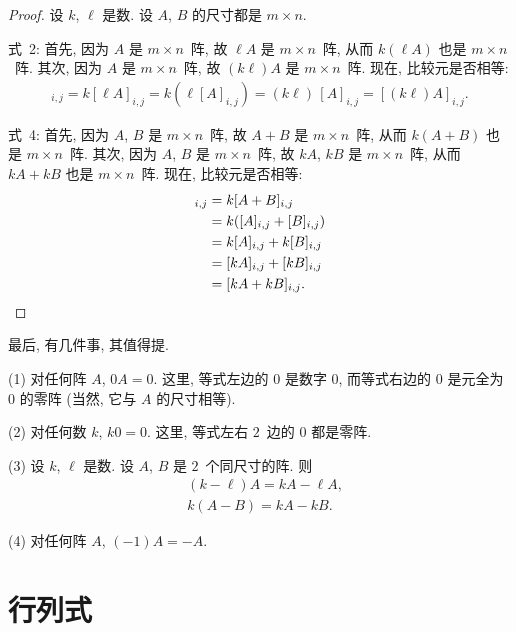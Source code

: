 \documentclass[../libro.tex]{subfiles}
\begin{document}
\begin{proof}
    设 \(k\), \(\ell\) 是数.
    设 \(A\), \(B\) 的尺寸都是 \(m \times n\).

    式~2:
    首先, 因为 \(A\) 是 \(m \times n\)~阵,
    故 \(\ell A\) 是 \(m \times n\)~阵,
    从而 \(k(\ell A)\) 也是 \(m \times n\)~阵.
    其次, 因为 \(A\) 是 \(m \times n\)~阵,
    故 \((k\ell) A\) 是 \(m \times n\)~阵.
    现在, 比较元是否相等:
    \begin{align*}
        [k(\ell A)]_{i,j}
        = k[\ell A]_{i,j}
        = k(\ell [A]_{i,j})
        = (k\ell)\, [A]_{i,j}
        = [(k\ell) A]_{i,j}.
    \end{align*}

    式~4:
    首先, 因为 \(A\), \(B\) 是 \(m \times n\)~阵,
    故 \(A + B\) 是 \(m \times n\)~阵,
    从而 \(k(A + B)\) 也是 \(m \times n\)~阵.
    其次, 因为 \(A\), \(B\) 是 \(m \times n\)~阵,
    故 \(kA\), \(kB\) 是 \(m \times n\)~阵,
    从而 \(kA + kB\) 也是 \(m \times n\)~阵.
    现在, 比较元是否相等:
    \begin{align*}
        [k(A + B)]_{i,j}
        = {} & k[A + B]_{i,j}           \\
        = {} & k([A]_{i,j} + [B]_{i,j}) \\
        = {} & k[A]_{i,j} + k[B]_{i,j}  \\
        = {} & [kA]_{i,j} + [kB]_{i,j}  \\
        = {} & [kA + kB]_{i,j}.
        \qedhere
    \end{align*}
\end{proof}

最后, 有几件事, 其值得提.

(1)
对任何阵 \(A\), \(0A = 0\).
这里, 等式左边的 \(0\) 是数字 \(0\),
而等式右边的 \(0\) 是元全为 \(0\) 的零阵
(当然, 它与 \(A\) 的尺寸相等).

(2)
对任何数 \(k\), \(k0 = 0\).
这里, 等式左右 \(2\)~边的 \(0\) 都是零阵.

(3)
设 \(k\), \(\ell\) 是数.
设 \(A\), \(B\) 是 \(2\)~个同尺寸的阵.
则
\begin{align*}
    & (k - \ell) A = kA - \ell A, \\
    & k(A - B) = kA - kB.
\end{align*}

(4)
对任何阵 \(A\), \((-1)A = -A\).

\section{行列式}
\end{document}
